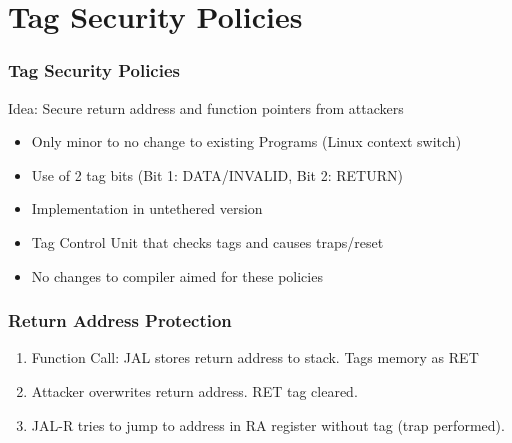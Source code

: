 \documentclass{beamer}
\begin{document}
\section{Tag Security Policies}

\begin{frame}
	\frametitle{Tag Security Policies}
   Idea: Secure return address and function pointers from attackers
   \begin{itemize}
	   \item Only minor to no change to existing Programs (Linux context switch)
 	  \item Use of 2 tag bits (Bit 1: DATA/INVALID, Bit 2: RETURN)
 	  \item Implementation in untethered version
 	  \item Tag Control Unit that checks tags and causes traps/reset   
 	  \item No changes to compiler aimed for these policies
   \end{itemize}
\end{frame}

\begin{frame}
	\frametitle{Return Address Protection}
	\begin{enumerate}
	\item Function Call: JAL stores return address to stack. Tags memory as RET
	\item Attacker overwrites return address. RET tag cleared.
	\item JAL-R tries to jump to address in RA register without tag (trap performed).
	\end{enumerate}
	\begin{figure}[!h]
		\begin{center}
	\end{center}
	\end{figure}
\end{frame}
\end{document}
